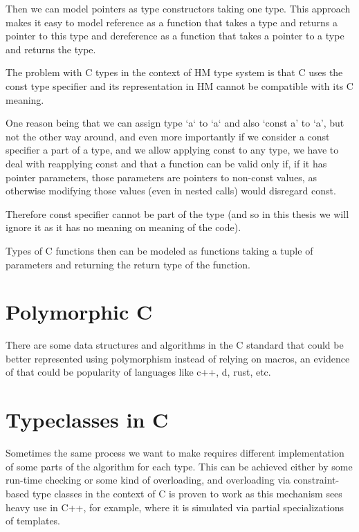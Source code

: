 Then we can model pointers as type constructors taking one type.
This approach makes it easy to model reference as a function that takes a type and returns a pointer to this type
and dereference as a function that takes a pointer to a type and returns the type.

The problem with C types in the context of HM type system is that C uses the const type specifier and its representation
in HM cannot be compatible with its C meaning.

One reason being that we can assign type `a` to `a` and also `const a' to `a', but not the other way around, and even
more importantly if we consider a const specifier a part of a type, and we allow applying const to any type, we have
to deal with reapplying const and that a function can be valid only if, if it has pointer parameters, those parameters
are pointers to non-const values, as otherwise modifying those values (even in nested calls) would disregard const.

Therefore const specifier cannot be part of the type (and so in this thesis we will ignore it as it has no meaning on
meaning of the code).

Types of C functions then can be modeled as functions taking a tuple of parameters and returning the return type of the
function.


\section{Polymorphic C}

There are some data structures and algorithms in the C standard that could be better represented using polymorphism instead of relying on
macros, an evidence of that could be popularity of languages like c++, d, rust, etc.

\section{Typeclasses in C}

Sometimes the same process we want to make requires different implementation of some parts of the algorithm
for each type. This can be achieved either by some run-time checking or some kind of overloading, and overloading via
constraint-based type classes in the context of C is proven to work as this mechanism sees heavy use in C++, for example,
where it is simulated via partial specializations of templates.



